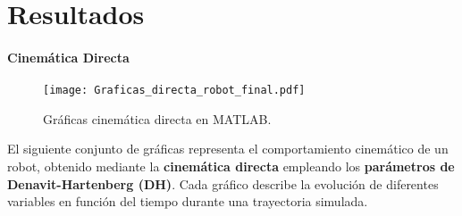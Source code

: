 \chapter{Resultados} \label{chap:resultados}

\subsubsection{Cinemática Directa}
\begin{figure}[H] 
	\centering
	\texttt{[image: Graficas\_directa\_robot\_final.pdf]}
	\caption{Gráficas cinemática directa en MATLAB.}
	\label{fig:TablasCinematicaDirecta}
\end{figure}

 
 El siguiente conjunto de gráficas representa el comportamiento cinemático de un robot, obtenido mediante la \textbf{cinemática directa} empleando los \textbf{parámetros de Denavit-Hartenberg (DH)}. Cada gráfico describe la evolución de diferentes variables en función del tiempo durante una trayectoria simulada.
 
